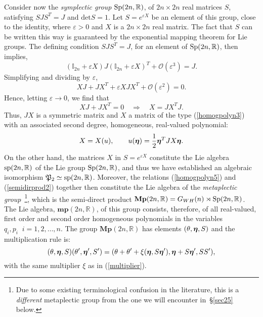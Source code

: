 \documentclass[12pt]{amsart}
\numberwithin{equation}{section}
\theoremstyle{remark}
\newcommand{\be}{\begin{equation}}
\newcommand{\en}{\end{equation}}
\newcommand{\bfeta}{\mbox{\boldmath $\eta$}}
\newcommand{\BMP}{\mathbf{Mp}}
\newcommand{\bmp}{\mathbf{mp}}
\begin{document}
Consider now the {\em symplectic group}
$\mbox{\rm Sp}(2n, \mathbb R )$, of $2n\times 2n$ real matrices $S$, satisfying
$SJS^T = J$ and $\text{det} S = 1$. Let
$S = \displaystyle{e^{\varepsilon X}}$ be an element of this group, close to
the identity, where $\varepsilon > 0$ and $X$ is a $2n\times 2n$ real matrix.
The fact that $S$ can be written this way is guaranteed by the exponential
mapping theorem for Lie groups. The defining condition $SJS^{T} = J$,
for an element of $\mbox{\rm Sp}(2n, \mathbb R )$, then implies,
 $$ ({\mathbb I}_{2n} + \varepsilon X)J({\mathbb I}_{2n} + \varepsilon X)^T
         + {\mathcal O}(\varepsilon^{3}) = J. $$
Simplifying and dividing by $\varepsilon$,
$$ XJ + JX^{T} + \varepsilon XJX^{T} + {\mathcal O}(\varepsilon^{2}) = 0.$$
Hence, letting $\varepsilon \rightarrow 0$, we find that
\be
   XJ + JX^{T} = 0 \quad \Rightarrow \quad X = JX^{T}J.
\label{symplgroup1}
\en
Thus, $JX$ is a symmetric matrix and $X$ a matrix of the type
(\ref{homogpolyn3}) with an associated second degree, homogeneous, real-valued
polynomial:
\be
   X = X(u), \qquad u(\bfeta) = \frac 12 \bfeta^{T}JX\bfeta .
\label{symplgroup2}
\en
On the other hand, the matrices $X$ in
$S = \displaystyle{e^{\varepsilon X}}$ constitute the Lie algebra
$\mbox{\rm sp}(2n, \mathbb R )$ of the Lie group
$\mbox{\rm Sp}(2n, \mathbb R )$, and thus we have established
an algebraic
isomorphism ${\mathfrak P}_{2}\simeq  \mbox{\rm sp}(2n, \mathbb R )$.
Moreover, the relations (\ref{homogpolyn5}) and (\ref{semidirprod2})
together then constitute the Lie algebra of the {\em metaplectic
group}~\footnote{Due to some existing terminological confusion in the
literature, this is a {\it different} metaplectic group from the one we
will encounter in~\S\ref{sec25} below.}, which is the semi-direct product
$\BMP(2n, \mathbb R ) =
G_{WH}(n)\rtimes\mbox{\rm Sp}(2n, \mathbb R )$. The Lie algebra,
$\bmp(2n, \mathbb R )$, of this group consists, therefore, of
all real-valued, first order and second order homogeneous polynomials
in the variables $q_i, p_{i} \;\; i=1,2, \ldots , n$. The group
$\BMP(2n, \mathbb R )$ has elements
$(\theta , \bfeta , S)$ and the multiplication rule is:
\be
(\theta , \bfeta , S)(\theta', \bfeta', S') = (\theta + \theta'
  + \xi (\bfeta , S\bfeta'), \bfeta + S\bfeta', SS'),
\label{metaplectgroup1}
\en
with the same multiplier $\xi$ as in (\ref{multiplier}).
\end{document}

